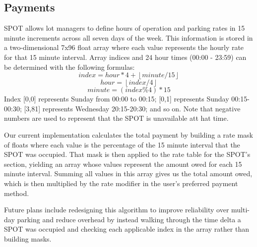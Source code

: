 \subsection{Payments}
SPOT allows lot managers to define hours of operation and parking rates in 15 minute increments across all seven days of the week.
This information is stored in a two-dimensional 7x96 float array where each value represents the hourly rate for that 15 minute interval.
Array indices and 24 hour times (00:00 - 23:59) can be determined with the following formulas:
\begin{equation}
    index = hour * 4 + \left \lfloor{minute / 15}\right \rfloor
\end{equation}
\begin{equation}
    hour = \left \lfloor{index / 4}\right \rfloor
\end{equation}
\begin{equation}
    minute = (index \% 4) * 15
\end{equation}
Index [0,0] represents Sunday from 00:00 to 00:15; [0,1] represents Sunday 00:15-00:30; [3,81] represents Wednesday 20:15-20:30; and so on.
Note that negative numbers are used to represent that the SPOT is unavailable att hat time.

Our current implementation calculates the total payment by building a rate mask of floats where each value is the percentage of the 15 minute interval that the SPOT was occupied.
That mask is then applied to the rate table for the SPOT's section, yielding an array whose values represent the amount owed for each 15 minute interval.
Summing all values in this array gives us the total amount owed, which is then multiplied by the rate modifier in the user's preferred payment method.

Future plans include redesigning this algorithm to improve reliability over multi-day parking and reduce overhead by instead walking through the time delta a SPOT was occupied and checking each applicable index in the array rather than building masks.


